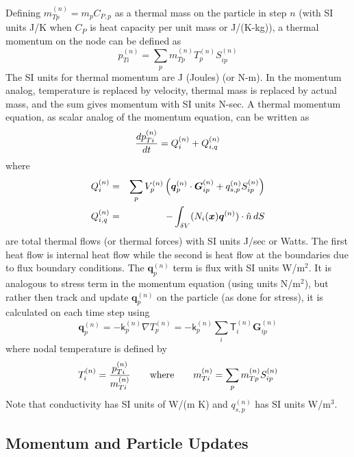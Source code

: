 \documentclass[11pt]{article}
\renewcommand{\vec}[1]{\boldsymbol{#1}}
\newcommand{\tens}[1]{\boldsymbol{\mathsf{#1}}}
\begin{document}
Defining $m_{Tp}^{(n)} = m_p C_{P,p}$ as a thermal mass on the particle in step $n$ (with SI units J/K when $C_{P}$ is heat capacity per unit mass or J/(K-kg)), a thermal momentum on the node can be defined as
\begin{equation}
      p_{Ti}^{(n)} = \sum_p  m_{Tp}^{(n)} T_p^{(n)} S^{(n)}_{ip}  
\end{equation}
The SI units for thermal momentum are J (Joules) (or N-m). In the momentum analog, temperature is replaced by velocity, thermal mass is replaced by actual mass, and the sum gives momentum with SI units N-sec. A thermal momentum equation, as scalar analog of the momentum equation, can be written as
\begin{equation}
     {d p_{Ti}^{(n)}\over dt} = Q_{i}^{(n)} + Q_{i,q}^{(n)}
\end{equation}
where
\begin{eqnarray}
      Q_{i}^{(n)} & = & \sum_p V_p^{(n)}  \left(\vec q_p^{(n)}\cdot \vec G^{(n)}_{ip}  + q_{s,p}^{(n)} S^{(n)}_{ip} \right) \\
      Q_{i,q}^{(n)} & = & -  \int_{\delta V} (N_i(\vec x)\vec q^{(n)})\cdot \hat n \thinspace dS 
\end{eqnarray}
are total thermal flows (or thermal forces) with SI units J/sec or Watts. The first heat flow is internal heat flow while the second is heat flow at the boundaries due to flux boundary conditions. The $\vec q_p^{(n)}$ term is flux with SI units W/m$^2$. It is analogous to stress term in the momentum equation (using units N/m$^2$), but rather then track and update $\vec q_p^{(n)}$ on the particle (as done for stress), it is calculated on each time step using
\begin{equation}
    \vec q_p^{(n)} = -\tens k_p^{(n)}\nabla T_p^{(n)} = - \tens k_p^{(n)}\sum_i \tens  T_i^{(n)} \vec G^{(n)}_{ip}
\end{equation}
where nodal temperature is defined by
\begin{equation}
       T_i^{(n)} = {p_{Ti}^{(n)} \over m_{Ti}^{(n)}} \qquad {\rm where } \qquad m_{Ti}^{(n)} = \sum_p  m_{Tp}^{(n)} S^{(n)}_{ip}  
\end{equation}
Note that conductivity has SI units of W/(m K) and $q_{s,p}^{(n)}$ has SI units W/m$^3$.

\subsection{Momentum and Particle Updates}
\end{document}
